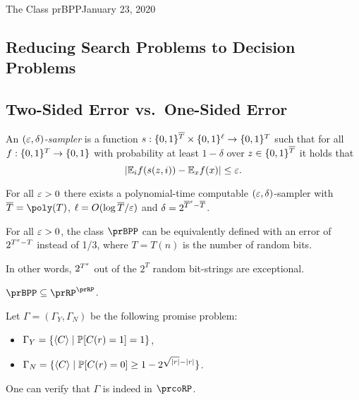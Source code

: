 \begin{lecture}{1}{The Class prBPP}{January 23, 2020}

\subsection{Reducing Search Problems to Decision Problems}

\subsection{Two-Sided Error vs.\ One-Sided Error}


\begin{definition}
  An \emph{$(\varepsilon, \delta)$-sampler} is a function $s :
  \{0,1\}^{\overline{T}} \times \{0,1\}^\ell \to \{0,1\}^T$ such that for
  all $f : \{0,1\}^T \to \{0,1\}$ with probability at least $1 - \delta$ 
  over $z \in \{0,1\}^{\overline{T}}$ it holds that \[
    |\mathbb{E}_i f(s(z, i)) - \mathbb{E}_x f(x)| \le \varepsilon.
  \]
\end{definition}

\begin{theorem}
  For all $\varepsilon > 0$ there exists a polynomial-time computable $(\varepsilon,
  \delta)$-sampler with $\overline{T} = \poly(T)$, $\ell = O(\log
  \overline{T}/\varepsilon)$ and $\delta = 2^{\overline{T}^\varepsilon - \overline{T}}$.
\end{theorem}

\begin{corollary}\label{cor:bpp-small-random}
  For all $\varepsilon > 0$, the class $\prBPP$ can be equivalently defined with an
  error of $2^{T^\varepsilon - T}$ instead of 1/3, where $T = T(n)$ is the number of
  random bits.

  In other words, $2^{T^\varepsilon}$ out of the $2^T$ random bit-strings are exceptional.
\end{corollary}

\begin{theorem}\label{thm:bpp-subset-rprp}
    $\prBPP \subseteq \prRP^\prRP$.
\end{theorem}

\begin{proofsk}
    Let $\Gamma = (\Gamma_Y, \Gamma_N)$ be the following promise problem:
    \begin{itemize}
        \item $\Gamma_Y = \{\langle C \rangle \mid \mathbb{P}[C(r) = 1] = 1\}$,
        \item $\Gamma_N = \{\langle C \rangle \mid \mathbb{P}[C(r) = 0] \geq 1 - 2^{\sqrt{|r|} - |r|}\}$.
    \end{itemize}
    One can verify that $\Gamma$ is indeed in $\prcoRP$.


\end{proofsk}
\end{lecture}

